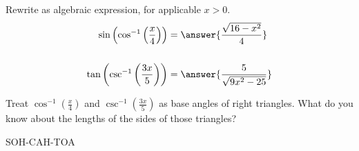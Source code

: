 \documentclass{ximera}
\author{Bobby Ramsey}
\begin{document}
\begin{exercise}
Rewrite as algebraic expression, for applicable $x>0$.
\begin{align*}
	\sin\left( \cos^{-1}\left(\frac{x}{4}\right) \right) &= \answer{\frac{\sqrt{16-x^2}}{4}} \\ \\
	\tan\left( \csc^{-1}\left( \frac{3x}{5} \right) \right) &= \answer{\frac{5}{\sqrt{9x^2-25}}}
\end{align*}	

\begin{hint}
	Treat $\cos^{-1}\left(\frac{x}{4}\right)$ and $\csc^{-1}\left( \frac{3x}{5} \right)$ as base angles of right triangles.
	What do you know about the lengths of the sides of those triangles?

	SOH-CAH-TOA
\end{hint}
\end{exercise}
\end{document}
